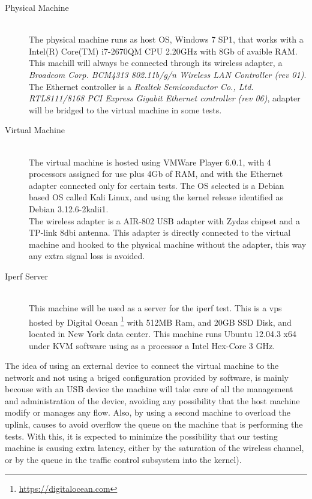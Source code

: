\begin{description}

\item [Physical Machine] \hfill \\
The physical machine runs as host OS, Windows 7 SP1, that works with a Intel(R)
Core(TM) i7-2670QM CPU \@ 2.20GHz with 8Gb of avaible RAM. This machill will 
always be connected through its wireless adapter, a \textit{Broadcom Corp. 
BCM4313 802.11b/g/n Wireless LAN Controller (rev 01)}. The Ethernet controller 
is a \textit{Realtek Semiconductor Co., Ltd. RTL8111/8168 PCI Express Gigabit 
Ethernet controller (rev 06)}, adapter will be bridged to the virtual 
machine in some tests.\\

\item[Virtual Machine] \hfill \\
The virtual machine is hosted using VMWare Player 6.0.1, with 4 processors 
assigned for use plus 4Gb of RAM, and with the Ethernet adapter connected only
for certain tests. The OS selected is a Debian based OS called Kali Linux, and
using the kernel release identified as Debian 3.12.6-2kalii1.\\

The wireless adapter is a AIR-802 USB adapter with Zydas chipset and a TP-link 
8dbi antenna. This adapter is directly connected to the virtual machine and 
hooked to the physical machine without the adapter, this way any extra signal 
loss is avoided. \\

\item[Iperf Server] \hfill \\
This machine will be used as a server for the iperf test. This is a vps hosted 
by Digital Ocean \footnote{\url{https://digitalocean.com}} with 512MB Ram, and 
20GB SSD Disk, and located in New York data center. This machine runs Ubuntu 
12.04.3 x64 under KVM software using as a processor a Intel Hex-Core 3 GHz.

\end{description}

The idea of using an external device to connect the virtual machine to the 
network and not using a briged configuration provided by software, is mainly 
becouse with an USB device the machine will take care of all the management and 
administration of the device, avoiding any possibility that the host machine 
modify or manages any flow. Also, by using a second machine to overload the 
uplink, causes to avoid overflow the queue on the machine that is performing 
the tests. With this, it is expected to minimize the possibility that our 
testing machine is causing extra latency, either by the saturation of the 
wireless channel, or by the queue in the traffic control subsystem into the 
kernel). \\


